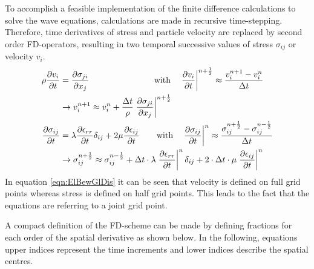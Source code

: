 \documentclass[pdftex,a4paper,parskip,listof=totoc,bibliography=totoc,onehalfspacing,12pt]{scrreprt}
\begin{document}
To accomplish a feasible implementation of the finite difference calculations to solve the wave equations, calculations are made in recursive time-stepping. Therefore, time derivatives of stress and particle velocity are replaced by second order FD-operators, resulting in two temporal successive values of stress $\sigma_{ij}$ or velocity $v_i$.
\begin{align}
	\rho \frac{\partial v_i}{\partial t} &= \frac{\partial \sigma_{ji}}{\partial x_j} \qquad \qquad \qquad \quad \,\,\,\, \text{with} \quad \left.\frac{\partial v_i}{\partial t}\right\rvert^{n+\frac{1}{2}} \approx \frac{v_i^{n+1} - v_i^{n}}{\Delta t}\notag\\
	&\rightarrow v_i^{n+1} \approx v_i^n + \frac{\Delta t}{\rho}  \left.\frac{\partial \sigma_{ji}}{\partial x_j}\right\rvert^{n+\frac{1}{2}}\label{eqn:ElBewGlDis}\\
	\frac{\partial \sigma_{ij}}{\partial t} &= \lambda \frac{\partial \epsilon_{rr}}{\partial t} \delta_{ij} + 2 \mu \frac{\partial \epsilon_{ij}}{\partial t} \qquad \text{with} \quad \left.\frac{\partial \sigma_{ij}}{\partial t}\right\rvert^n \approx \frac{\sigma_{ij}^{n+\frac{1}{2}} - \sigma_{ij}^{n-\frac{1}{2}}}{\Delta t}\notag\\
	&\rightarrow \sigma_{ij}^{n+\frac{1}{2}} \approx \sigma_{ij}^{n-\frac{1}{2}} + \Delta t \cdot \lambda \left.\frac{\partial \epsilon_{rr}}{\partial t}\right\rvert^n \delta_{ij} + 2 \cdot \Delta t \cdot \mu \left. \frac{\partial \epsilon_{ij}}{\partial t}\right\rvert^n
\end{align}
In equation \ref{eqn:ElBewGlDis} it can be seen that velocity is defined on full grid points whereas stress is defined on half grid points. This leads to the fact that the equations are referring to a joint grid point. 

A compact definition of the FD-scheme can be made by defining fractions for each order of the spatial derivative as shown below. 
In the following, equations upper indices represent the time increments and lower indices describe the spatial centres. 
\end{document}
